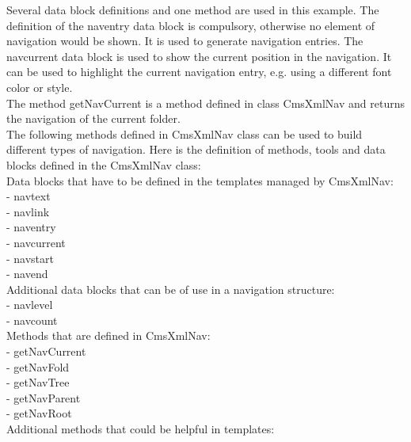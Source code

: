 Several data block definitions and one method are used in this 
example. The definition of the {\name naventry} data block is 
compulsory, otherwise no element of navigation would be shown. 
It is used to generate navigation entries. The {\name navcurrent} 
data block is used to show the current position in the navigation. 
It can be used to highlight the current navigation entry, e.g.
using a different font color or style. \\
The method {\name getNavCurrent} is a method defined in class 
CmsXmlNav and returns the navigation of the current folder. \\

The following methods defined in CmsXmlNav class can be used 
to build different types of navigation. Here is the definition 
of methods, tools and data blocks defined in the CmsXmlNav 
class: \\

Data blocks that have to be defined in the templates managed 
by CmsXmlNav: \\

- navtext  \\
- navlink  \\
- naventry  \\
- navcurrent  \\
- navstart  \\
- navend  \\

Additional data blocks that can be of use in a navigation structure: \\

- navlevel  \\
- navcount  \\

Methods that are defined in CmsXmlNav: \\

- getNavCurrent  \\
- getNavFold  \\
- getNavTree  \\
- getNavParent  \\
- getNavRoot  \\


Additional methods that could be helpful in templates: \\

